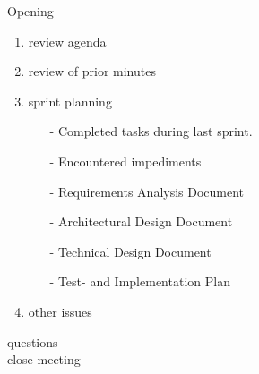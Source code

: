 \documentclass[pdftex, 12pt, a4paper]{report}
\begin{document}
\pagestyle{fancy}

Opening

\begin{enumerate}
\item review agenda	
		
\item review of prior minutes

\item sprint planning

\begin{enumerate}
\item[-] Completed tasks during last sprint.

\item[-] Encountered impediments

\item[-] Requirements Analysis Document

\item[-] Architectural Design Document

\item[-] Technical Design Document

\item[-] Test- and Implementation Plan

\end{enumerate}
\item other issues

\end{enumerate}

questions\\

close meeting
\end{document}
